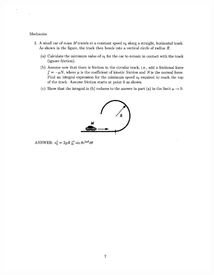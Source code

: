 \documentclass[10pt,a4paper]{article}
\begin{document}
\begin{figure}[H]
 \centering
 \includegraphics[width=16cm]{pdf/1-1T37.png}
\end{figure}
 \newpage
\end{document}
